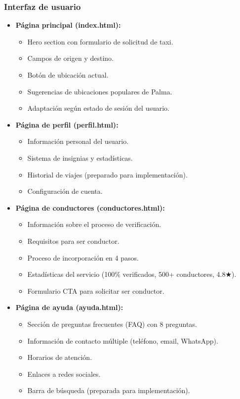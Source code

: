 \documentclass[12pt,a4paper]{article}
\begin{document}
\subsubsection{Interfaz de usuario}

\begin{itemize}
    \item \textbf{Página principal (index.html):}
    \begin{itemize}
        \item Hero section con formulario de solicitud de taxi.
        \item Campos de origen y destino.
        \item Botón de ubicación actual.
        \item Sugerencias de ubicaciones populares de Palma.
        \item Adaptación según estado de sesión del usuario.
    \end{itemize}
    
    \item \textbf{Página de perfil (perfil.html):}
    \begin{itemize}
        \item Información personal del usuario.
        \item Sistema de insignias y estadísticas.
        \item Historial de viajes (preparado para implementación).
        \item Configuración de cuenta.
    \end{itemize}
    
    \item \textbf{Página de conductores (conductores.html):}
    \begin{itemize}
        \item Información sobre el proceso de verificación.
        \item Requisitos para ser conductor.
        \item Proceso de incorporación en 4 pasos.
        \item Estadísticas del servicio (100\% verificados, 500+ conductores, 4.8★).
        \item Formulario CTA para solicitar ser conductor.
    \end{itemize}
    
    \item \textbf{Página de ayuda (ayuda.html):}
    \begin{itemize}
        \item Sección de preguntas frecuentes (FAQ) con 8 preguntas.
        \item Información de contacto múltiple (teléfono, email, WhatsApp).
        \item Horarios de atención.
        \item Enlaces a redes sociales.
        \item Barra de búsqueda (preparada para implementación).
    \end{itemize}
\end{itemize}
\end{document}
